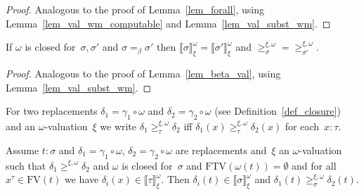 \documentclass[a4paper,UKenglish,cleveref,autoref,numberwithinsect]{lipics-v2019}
\theoremstyle{definition}
\newcommand{\FTV}{\mathrm{FTV}}
\newcommand{\FV}{\mathrm{FV}}
\newcommand{\val}[3]{\ensuremath{\llbracket#1\rrbracket_{#2}^{#3}}}
\newcommand{\gteq}[3]{\ensuremath{\ge_{#1}^{#2,#3}}}
\begin{document}
\begin{proof}
  Analogous to the proof of Lemma~\ref{lem_forall}, using
  Lemma~\ref{lem_val_wm_computable} and Lemma~\ref{lem_val_subst_wm}.
\end{proof}

\begin{lemma}\label{lem_beta_val_wm}
  If $\omega$ is closed for~$\sigma,\sigma'$ and $\sigma =_\beta
  \sigma'$ then $\val{\sigma}{\xi}{\omega} =
  \val{\sigma'}{\xi}{\omega}$ and ${\gteq{\sigma}{\xi}{\omega}} =
      {\gteq{\sigma'}{\xi}{\omega}}$.
\end{lemma}

\begin{proof}
  Analogous to the proof of Lemma~\ref{lem_beta_val}, using
  Lemma~\ref{lem_val_subst_wm}.
\end{proof}

For two replacements $\delta_1 = \gamma_1 \circ \omega$ and $\delta_2
= \gamma_2 \circ \omega$ (see Definition~\ref{def_closure}) and an
$\omega$-valuation~$\xi$ we write $\delta_1 \gteq{\tau}{\xi}{\omega}
\delta_2$ iff $\delta_1(x) \gteq{\tau}{\xi}{\omega} \delta_2(x)$ for
each~$x : \tau$.

\begin{lemma}\label{lem_typable_wm_computable}
  Assume $t : \sigma$ and $\delta_1=\gamma_1\circ\omega$,
  $\delta_2=\gamma_2\circ\omega$ are replacements and~$\xi$ an
  $\omega$-valuation such that $\delta_1 \gteq{}{\xi}{\omega}
  \delta_2$ and $\omega$ is closed for~$\sigma$ and $\FTV(\omega(t)) =
  \emptyset$ and for all $x^\tau \in \FV(t)$ we have $\delta_i(x) \in
  \val{\tau}{\xi}{\omega}$. Then $\delta_i(t) \in
  \val{\sigma}{\xi}{\omega}$ and $\delta_1(t)
  \gteq{\sigma}{\xi}{\omega} \delta_2(t)$.
\end{lemma}
\end{document}
